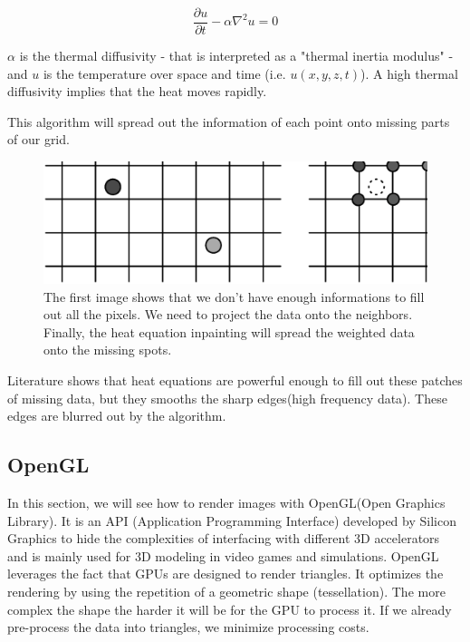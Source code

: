 \begin{equation}\label{eqn:heateq}
\frac{\partial u}{\partial t} - \alpha \nabla^2 u = 0
\end{equation}

$\alpha$ is the thermal diffusivity - that is interpreted as a "thermal inertia modulus" - and $u$ is the temperature over space and time (i.e. $u(x,y,z,t)$). A high thermal diffusivity implies that the heat moves rapidly.

This algorithm will spread out the information of each point onto missing parts of our grid.

\begin{figure}[!ht]
  \centering
  \includegraphics[scale=0.3]{images/inpainting3step.eps}
    \caption{The first image shows that we don't have enough informations to fill out all the pixels. We need to project the data onto the neighbors. Finally, the heat equation inpainting will spread the weighted data onto the missing spots.}
  \label{inpainting3step}
\end{figure}

Literature shows that heat equations are powerful enough to fill out these patches of missing data, but they smooths the sharp edges(high frequency data)\cite{aubert2006mathematical}. These edges are blurred out by the algorithm.


\subsection{OpenGL}

In this section, we will see how to render images with OpenGL(Open Graphics Library). It is an API (Application Programming Interface) developed by Silicon Graphics to hide the complexities of interfacing with different 3D accelerators and is mainly used for 3D modeling in video games and simulations. OpenGL leverages the fact that GPUs are designed to render triangles. It optimizes the rendering by using the repetition of a geometric shape (tessellation). The more complex the shape the harder it will be for the GPU to process it. If we already pre-process the data into triangles, we minimize processing costs. \cite{abobegpu}

